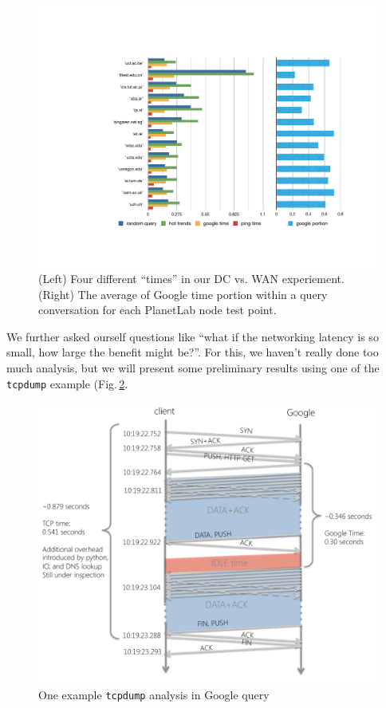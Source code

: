 \begin{figure}[!htb]
  \centering
  \includegraphics[width=\linewidth]{../figs/data_center.pdf}
  \caption{(Left) Four different ``times'' in our DC vs. WAN experiement. (Right) The average of Google time portion within a query conversation for each PlanetLab node test point.}
  \label{fig:data_center}
\end{figure}

We further asked ourself questions like ``what if the networking latency is so small, how large the benefit might be?''. For this, we haven't really done too much analysis, but we will present some preliminary results using one of the \texttt{tcpdump} example (Fig.\,\ref{fig:tcpdump}. 

\begin{figure}[!htb]
  \centering
  \includegraphics[width=\linewidth]{../figs/tcpdump.pdf}
  \caption{One example \texttt{tcpdump} analysis in Google query}
  \label{fig:tcpdump}
\end{figure}

